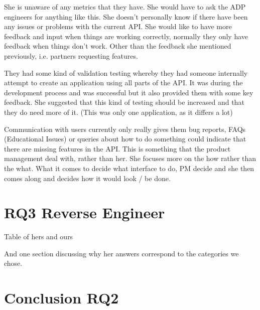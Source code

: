 \documentclass[conference]{IEEEtran}
\begin{document}
She is unaware of any metrics that they have. She would have to ask the ADP engineers for anything like this. She doesn’t personally know if there have been any issues or problems with the current API. She would like to have more feedback and input when things are working correctly, normally they only have feedback when things don’t work. Other than the feedback she mentioned previously, i.e. partners requesting features.



They had some kind of validation testing whereby they had someone internally attempt to create an application using all parts of the API. It was during the development process and was successful but it also provided them with some key feedback. She suggested that this kind of testing should be increased and that they do need more of it. (This was only one application, as it differs a lot)

Communication with users currently only really gives them bug reports, FAQs (Educational Issues) or queries about how to do something could indicate that there are missing features in the API. This is something that the product management deal with, rather than her. She focuses more on the how rather than the what. What it comes to decide what interface to do, PM decide and she then comes along and decides how it would look / be done. 

\section{RQ3 Reverse Engineer}
Table of hers and ours

And one section discussing why her answers correspond to the categories we chose.





\section{Conclusion RQ2} \label{conclusion}





\end{document}
